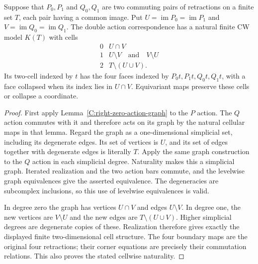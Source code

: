 \begin{lemma}
\label{C:two-retraction-cubical-model}
Suppose that $P_0,P_1$ and $Q_0,Q_1$ are two commuting pairs
of retractions on a finite set $T$, each pair having a common
image.  Put $U=\operatorname{im}P_0=\operatorname{im}P_1$
and $V=\operatorname{im}Q_0=\operatorname{im}Q_1$.
The double action correspondence has a natural finite CW model
$K(T)$ with cells
\[
\begin{array}{c|l}
0&U\cap V\\
1&U\setminus V\quad\text{and}\quad V\setminus U\\
2&T\setminus(U\cup V).
\end{array}
\]
Its two-cell indexed by $t$ has the four faces indexed by
$P_0t,P_1t,Q_0t,Q_1t$, with a face collapsed when its index
lies in $U\cap V$.  Equivariant maps preserve these cells
or collapse a coordinate.
\end{lemma}
\begin{proof}
First apply Lemma~\ref{C:right-zero-action-graph} to the $P$
action.  The $Q$ action commutes with it and therefore acts
on its graph by the natural cellular maps in that lemma.
Regard the graph as a one-dimensional simplicial set, including
its degenerate edges.  Its set of vertices is $U$, and its set
of edges together with degenerate edges is literally $T$.
Apply the same graph construction to the $Q$ action in each
simplicial degree.  Naturality makes this a simplicial graph.
Iterated realization and the two action bars commute, and
the levelwise graph equivalences give the asserted equivalence.
The degeneracies are subcomplex inclusions, so this use of
levelwise equivalences is valid.

In degree zero the graph has vertices $U\cap V$ and edges
$U\setminus V$.  In degree one, the new vertices are
$V\setminus U$ and the new edges are
$T\setminus(U\cup V)$.  Higher simplicial degrees are
degenerate copies of these.  Realization therefore gives
exactly the displayed finite two-dimensional cell structure.
The four boundary maps are the original four retractions;
their corner equations are precisely their commutation
relations.  This also proves the stated cellwise naturality.
\end{proof}

